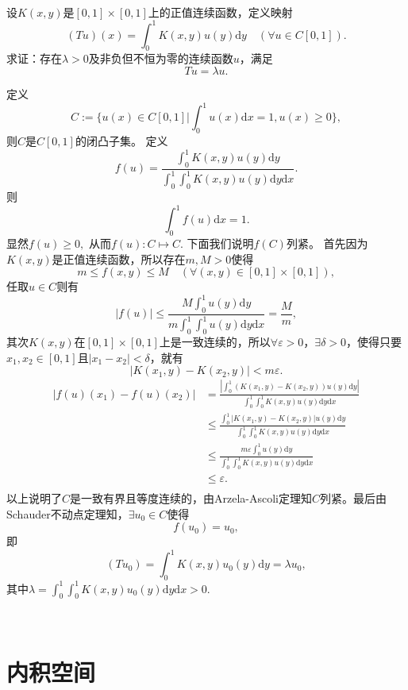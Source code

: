 \begin{exercise}
\hfill\\
设$K(x,y)$是$[0,1]\times[0,1]$上的正值连续函数，定义映射
$$(Tu)(x)=\int_0^1K(x,y)u(y)\mathrm{d}y\quad(\forall u\in C[0,1]).$$
求证：存在$\lambda>0$及非负但不恒为零的连续函数$u$，满足
$$Tu=\lambda u.$$

定义
$$C:=\{u(x)\in C[0,1]|\int_0^1u(x)\mathrm{d}x=1,u(x)\geq0\},$$
则$C$是$C[0,1]$的闭凸子集。
定义
$$f(u)=\frac{\int_0^1K(x,y)u(y)\mathrm{d}y}{\int_0^1\int_0^1K(x,y)u(y)\mathrm{d}y\mathrm{d}x}.$$
则$$\int_0^1f(u)\mathrm{d}x=1.$$显然$f(u)\geq0,$
从而$f(u):C\mapsto C.$
下面我们说明$f(C)$列紧。
首先因为$K(x,y)$是正值连续函数，所以存在$m,M>0$使得
$$m\leq f(x,y)\leq M\quad(\forall(x,y)\in[0,1]\times[0,1]),$$
任取$u\in C$则有
$$|f(u)|\leq\frac{M\int_0^1u(y)\mathrm{d}y}{m\int_0^1\int_0^1u(y)\mathrm{d}y\mathrm{d}x}=\frac{M}{m},$$
其次$K(x,y)$在$[0,1]\times[0,1]$上是一致连续的，所以$\forall\varepsilon>0$，$\exists\delta>0$，使得只要$x_1,x_2\in[0,1]$且$|x_1-x_2|<\delta$，就有$$|K(x_1,y)-K(x_2,y)|<m\varepsilon.$$
\begin{align*}
|f(u)(x_1)-f(u)(x_2)|&=\frac{|\int_0^1(K(x_1,y)-K(x_2,y))u(y)\mathrm{d}y|}{\int_0^1\int_0^1K(x,y)u(y)\mathrm{d}y\mathrm{d}x}\\
&\leq\frac{\int_0^1|K(x_1,y)-K(x_2,y)|u(y)\mathrm{d}y}{\int_0^1\int_0^1K(x,y)u(y)\mathrm{d}y\mathrm{d}x}\\
&\leq\frac{m\varepsilon\int_0^1u(y)\mathrm{d}y}{\int_0^1\int_0^1K(x,y)u(y)\mathrm{d}y\mathrm{d}x}\\
&\leq\varepsilon.\\
\end{align*}
以上说明了$C$是一致有界且等度连续的，由Arzela-Ascoli定理知$C$列紧。最后由Schauder不动点定理知，$\exists u_0\in C$使得$$f(u_0)=u_0,$$
即
$$(Tu_0)=\int_0^1K(x,y)u_0(y)\mathrm{d}y=\lambda u_0,$$其中$\lambda=\int_0^1\int_0^1K(x,y)u_0(y)\mathrm{d}y\mathrm{d}x>0.$
\end{exercise}
\hfill\\
\section{内积空间}


